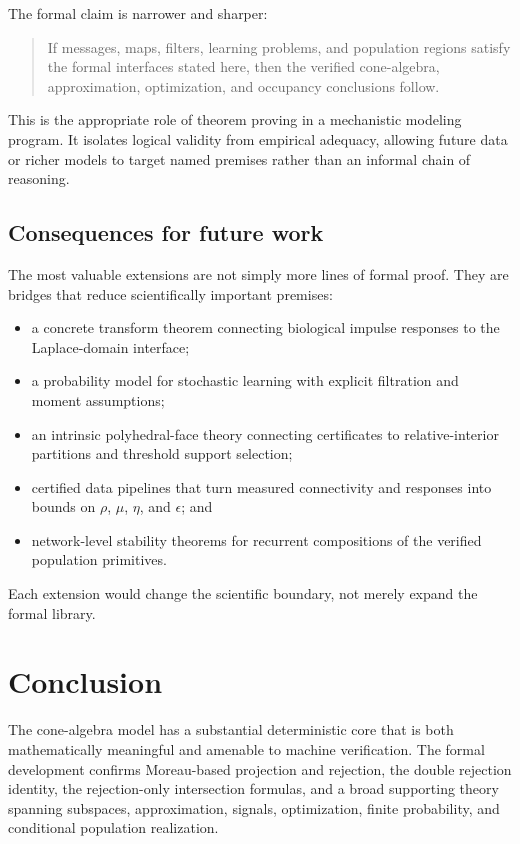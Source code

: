 \documentclass[11pt,a4paper]{article}
\begin{document}
The formal claim is narrower and sharper:

\begin{quote}
If messages, maps, filters, learning problems, and population regions satisfy
the formal interfaces stated here, then the verified cone-algebra,
approximation, optimization, and occupancy conclusions follow.
\end{quote}

This is the appropriate role of theorem proving in a mechanistic modeling
program. It isolates logical validity from empirical adequacy, allowing
future data or richer models to target named premises rather than an
informal chain of reasoning.

\subsection{Consequences for future work}

The most valuable extensions are not simply more lines of formal proof.
They are bridges that reduce scientifically important premises:

\begin{itemize}
  \item a concrete transform theorem connecting biological impulse responses
    to the Laplace-domain interface;
  \item a probability model for stochastic learning with explicit filtration
    and moment assumptions;
  \item an intrinsic polyhedral-face theory connecting certificates to
    relative-interior partitions and threshold support selection;
  \item certified data pipelines that turn measured connectivity and
    responses into bounds on \(\rho\), \(\mu\), \(\eta\), and \(\epsilon\);
    and
  \item network-level stability theorems for recurrent compositions of the
    verified population primitives.
\end{itemize}

Each extension would change the scientific boundary, not merely expand the
formal library.

\section{Conclusion}

The cone-algebra model has a substantial deterministic core that is both
mathematically meaningful and amenable to machine verification. The formal
development confirms Moreau-based projection and rejection, the double
rejection identity, the rejection-only intersection formulas, and a broad
supporting theory spanning subspaces, approximation, signals, optimization,
finite probability, and conditional population realization.
\end{document}
